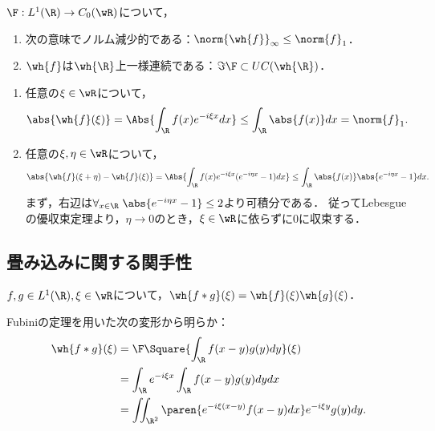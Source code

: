 \documentclass[uplatex,dvipdfmx]{jsreport}
\begin{document}
\begin{proposition}[Fourier変換の値域]\label{prop-basic-property-of-Fourier-transform}
    $\F:L^1(\R)\to C_0(\wR)$について，
    \begin{enumerate}
        \item 次の意味でノルム減少的である：$\norm{\wh{f}}_\infty\le\norm{f}_1$．
        \item $\wh{f}$は$\wh{\R}$上一様連続である：$\Im\F\subset UC(\wh{\R})$．
    \end{enumerate}
\end{proposition}
\begin{Proof}\mbox{}
    \begin{enumerate}
        \item 任意の$\xi\in\wR$について，
        \begin{align*}
            \abs{\wh{f}(\xi)}&=\Abs{\int_\R f(x)e^{-i\xi x}dx}\le\int_\R\abs{f(x)}dx=\norm{f}_1.
        \end{align*}
        \item 任意の$\xi,\eta\in\wR$について，
        \[\abs{\wh{f}(\xi+\eta)-\wh{f}(\xi)}=\Abs{\int_\R f(x)e^{-i\xi x}(e^{-i\eta x}-1)dx}\le\int_\R\abs{f(x)}\abs{e^{-i\eta x}-1}dx.\]
        まず，右辺は$\forall_{x\in\R}\;\abs{e^{-i\eta x}-1}\le2$より可積分である．
        従ってLebesgueの優収束定理より，$\eta\to0$のとき，$\xi\in\wR$に依らずに$0$に収束する．
    \end{enumerate}
\end{Proof}

\subsection{畳み込みに関する関手性}

\begin{proposition}[畳み込みに関する関手性]
    $f,g\in L^1(\R),\xi\in\wR$について，$\wh{f*g}(\xi)=\wh{f}(\xi)\wh{g}(\xi)$．
\end{proposition}
\begin{Proof}
    Fubiniの定理を用いた次の変形から明らか：
    \begin{align*}
        \wh{f*g}(\xi)&=\F\Square{\int_\R f(x-y)g(y)dy}(\xi)\\
        &=\int_\R e^{-i\xi x}\int_\R f(x-y)g(y)dydx\\
        &=\iint_{\R^2}\paren{e^{-i\xi(x-y)}f(x-y)dx}e^{-i\xi y}g(y)dy.
    \end{align*}
\end{Proof}
\end{document}
